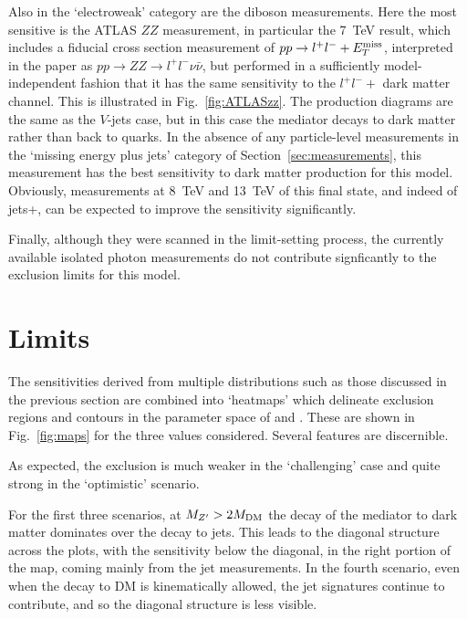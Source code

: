\documentclass[floatfix]{article}
\begin{document}
Also in the `electroweak' category are the diboson measurements. Here the most sensitive is the ATLAS $ZZ$ measurement, in particular the 7~TeV result, which includes
a fiducial cross section measurement of $pp \rightarrow l^+l^- + E_T^{\rm miss}$, interpreted in the paper as $pp \rightarrow ZZ \rightarrow l^+l^- \nu \bar{\nu}$, but performed in a 
sufficiently model-independent fashion that it has the same sensitivity to the $l^+l^- +$ dark matter channel. This is illustrated in Fig.~\ref{fig:ATLASzz}. 
The production diagrams are the same as the $V$-jets case, but in this case the 
mediator decays to dark matter rather than back to quarks. 
In the absence of any particle-level measurements in the `missing energy plus jets' category of 
Section~\ref{sec:measurements}, this measurement has the best sensitivity to dark matter production for this model. Obviously, measurements at 8~TeV and 13~TeV of this 
final state, and indeed of jets+\MET, can be expected to improve the sensitivity significantly.

Finally, although they were scanned in the limit-setting process, the currently available isolated photon measurements do not contribute signficantly to the exclusion
limits for this model.

\section{Limits}\label{sec:limits}

The sensitivities derived from multiple distributions such as those discussed in the previous section are combined into `heatmaps' which delineate exclusion 
regions and contours in the parameter space of \MDM and \MZP. These are shown in Fig.~\ref{fig:maps} for the three \GQ values considered.
Several features are discernible. 

As expected, the exclusion is much weaker in the `challenging' case and quite strong in the `optimistic' scenario.

For the first three scenarios, at $M_{Z^{\prime}} > 2M_{\rm DM}$ the decay of the mediator to dark matter dominates over the decay to jets. This leads to the diagonal structure across the plots, 
with the sensitivity below the diagonal, in the right portion of the map, coming mainly from the jet measurements. In the fourth scenario, even when the decay to
DM is kinematically allowed, the jet signatures continue to contribute, and so the diagonal structure is less visible. 
\end{document}
